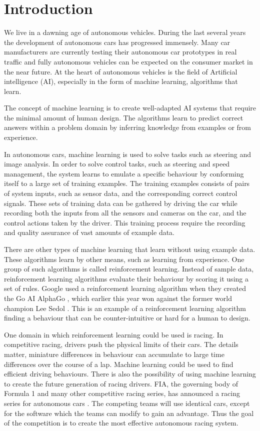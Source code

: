 \chapter{Introduction}
\label{introduction}

We live in a dawning age of autonomous vehicles. During the last several years the development of autonomous cars has progressed immensely. Many car manufacturers are currently testing their autonomous car prototypes in real traffic and fully autonomous vehicles can be expected on the consumer market in the near future. At the heart of autonomous vehicles is the field of Artificial intelligence (AI), especially in the form of machine learning, algorithms that learn.

The concept of machine learning is to create well-adapted AI systems that require the minimal amount of human design. The algorithms learn to predict correct answers within a problem domain by inferring knowledge from examples or from experience. 

In autonomous cars, machine learning is used to solve tasks such as steering and image analysis. In order to solve control tasks, such as steering and speed management, the system learns to emulate a specific behaviour by conforming itself to a large set of training examples. The training examples consists of pairs of system inputs, such as sensor data, and the corresponding correct control signals. These sets of training data can be gathered by driving the car while recording both the inputs from all the sensors and cameras on the car, and the control actions taken by the driver. This training process require the recording and quality assurance of vast amounts of example data.

There are other types of machine learning that learn without using example data. These algorithms learn by other means, such as learning from experience. One group of such algorithms is called reinforcement learning. Instead of sample data, reinforcement learning algorithms evaluate their behaviour by scoring it using a set of rules. Google used a reinforcement learning algorithm when they created the Go AI AlphaGo \cite{gibney}, which earlier this year won against the former world champion Lee Sedol \cite{AlphaGo}. This is an example of a reinforcement learning algorithm finding a behaviour that can be counter-intuitive or hard for a human to design.

One domain in which reinforcement learning could be used is racing. In competitive racing, drivers push the physical limits of their cars. The details matter, miniature differences in behaviour can accumulate to large time differences over the course of a lap. Machine learning could be used to find efficient driving behaviours. There is also the possibility of using machine learning to create the future generation of racing drivers. FIA, the governing body of Formula 1 and many other competitive racing series, has announced a racing series for autonomous cars \cite{roborace}. The competing teams will use identical cars, except for the software which the teams can modify to gain an advantage. Thus the goal of the competition is to create the most effective autonomous racing system. 

